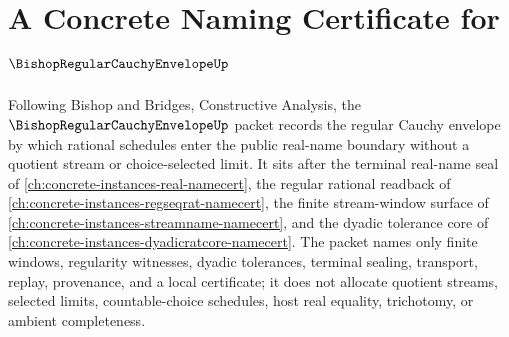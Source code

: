 \chapter{A Concrete Naming Certificate for $\BishopRegularCauchyEnvelopeUp$}
\label{ch:concrete-instances-bishop-regular-cauchy-envelope-namecert}

Following Bishop and Bridges, Constructive Analysis, the $\BishopRegularCauchyEnvelopeUp$ packet records the regular Cauchy envelope by which rational schedules enter the public real-name boundary without a quotient stream or choice-selected limit. It sits after the terminal real-name seal of \autoref{ch:concrete-instances-real-namecert}, the regular rational readback of \autoref{ch:concrete-instances-regseqrat-namecert}, the finite stream-window surface of \autoref{ch:concrete-instances-streamname-namecert}, and the dyadic tolerance core of \autoref{ch:concrete-instances-dyadicratcore-namecert}. The packet names only finite windows, regularity witnesses, dyadic tolerances, terminal sealing, transport, replay, provenance, and a local certificate; it does not allocate quotient streams, selected limits, countable-choice schedules, host real equality, trichotomy, or ambient completeness.

